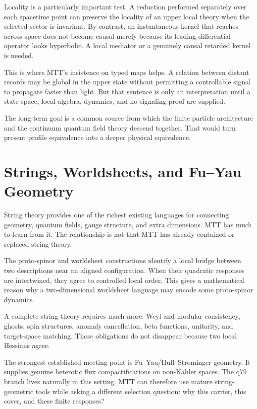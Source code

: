\documentclass[11pt,openany]{book}
\begin{document}
Locality is a particularly important test. A reduction performed separately
over each spacetime point can preserve the locality of an upper local theory
when the selected sector is invariant. By contrast, an instantaneous kernel
that reaches across space does not become causal merely because its leading
differential operator looks hyperbolic. A local mediator or a genuinely
causal retarded kernel is needed.

This is where MTT's insistence on typed maps helps. A relation between distant
records may be global in the upper state without permitting a controllable
signal to propagate faster than light. But that sentence is only an
interpretation until a state space, local algebra, dynamics, and no-signaling
proof are supplied.

The long-term goal is a common source from which the finite particle
architecture and the continuum quantum field theory descend together. That
would turn present profile equivalence into a deeper physical equivalence.

\chapter{Strings, Worldsheets, and Fu--Yau Geometry}

String theory provides one of the richest existing languages for connecting
geometry, quantum fields, gauge structure, and extra dimensions. MTT has much
to learn from it. The relationship is not that MTT has already contained or
replaced string theory.

The proto-spinor and worldsheet constructions identify a local bridge between
two descriptions near an aligned configuration. When their quadratic
responses are intertwined, they agree to controlled local order. This gives a
mathematical reason why a two-dimensional worldsheet language may encode some
proto-spinor dynamics.

A complete string theory requires much more: Weyl and modular consistency,
ghosts, spin structures, anomaly cancellation, beta functions, unitarity,
and target-space matching. Those obligations do not disappear because two
local Hessians agree.

The strongest established meeting point is Fu--Yau/Hull--Strominger geometry.
It supplies genuine heterotic flux compactifications on non-Kahler spaces.
The q79 branch lives naturally in this setting. MTT can therefore use mature
string-geometric tools while asking a different selection question: why this
carrier, this cover, and these finite responses?
\end{document}
